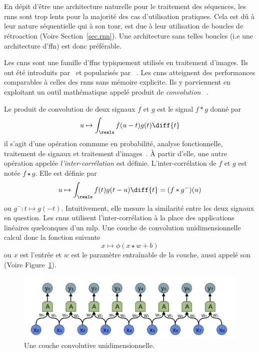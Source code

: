 \section{}
\label{sec.cnn}

En dépit d'être une architecture naturelle pour le traitement des séquences,
les \glspl{rnn} sont trop lents pour la majorité des cas d'utilisation pratiques.
Cela est dû à leur nature séquentielle qui à son tour, 
est due à leur utilisation de boucles de rétroaction (Voire Section~\ref{sec.rnn}).
Une architecture sans telles boucles (i.e une architecture d'\gls{ffn}) est donc préférable.

Les \glspl{cnn} sont une famille d'\glspl{ffn} typiquement utilisés en traitement d'images.
Ils ont été introduits par~\cite{Fukushima_1980} et popularisés par%
~\cite{LeCun_Boser_Denker_Henderson_Howard_Hubbard_Jackel_1989,Lecun_Bottou_Bengio_Haffner_1998}.
Les \glspl{cnn} atteignent des performances comparables à celles des \glspl{rnn} sans mémoire explicite.
Ils y parviennent en exploitant un outil mathématique appelé produit de \emph{convolution}%
~\cite{Calin_2020}.

Le produit de convolution de deux signaux \(f\) et \(g\) est le signal \(f \ast g\) donné par
\begin{equation}
    \label{eq.convolution}
    u \mapsto \int_\reals f(u-t)g(t)\diff{t}
\end{equation}
il s'agit d'une opération commune en probabilité, analyse fonctionnelle, 
traitement de signaux et traitement d'images~\cite{Barbe_Ledoux_2012,Oppenheim_Schafer_2013}.
À partir d'elle, une autre opération appelée \emph{l'inter-corrélation} est définie.
L'inter-corrélation de \(f\) et \(g\) est notée \(f\star g\).
Elle est définie par
\begin{equation}
    \label{eq.cros-corr}
    u \mapsto \int_\reals f(t)g(t-u)\diff{t} = (f \ast g^-)(u)
\end{equation}
ou \(g^- : t \mapsto g(-t)\).
Intuitivement, elle mesure la similarité entre les deux signaux en question.
Les \glspl{cnn} utilisent l'inter-corrélation à la place des applications linéaires quelconques d'un \gls{mlp}.
Une couche de convolution unidimensionnelle calcul donc la fonction suivante
\begin{equation}
    \label{eq.layer-conv1d}
    x \mapsto \phi\left(x\star w + b\right)
\end{equation}
ou \(x\) est l'entrée et \(w\) est le paramètre entraînable de la couche, aussi appelé son 
(Voire Figure~\ref{fig.layer-conv1d}).

\begin{figure}[hbt]
    \begin{center}
        \includegraphics[width=\textwidth]{assets/images/conv1d.png}
    \end{center}    
    \caption{Une couche convolutive unidimensionnelle.}
    \label{fig.layer-conv1d}
\end{figure}